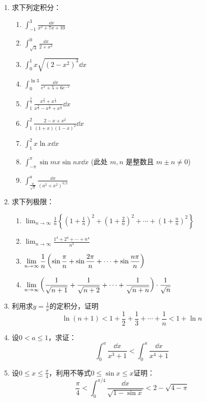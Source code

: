 \begin{enumerate}
\item 求下列定积分：
\begin{multicols}{2}
    \begin{enumerate}
        \item  $\displaystyle\int_{-1}^{3} \frac{\dd x}{x^{2}+7 x+10} $
        \item  $\displaystyle\int_{\sqrt{3}}^{0} \frac{\dd x}{2+x^{2}}$
        \item  $\displaystyle\int_{0}^{1} x \sqrt{\left(2-x^{2}\right)^{3}} \dd x$
        \item  $\displaystyle\int_{0}^{\ln 3} \frac{\dd x}{e^{x}+5+6 e^{-x}}$
        \item  $\displaystyle\int_{1}^{\tfrac{7}{5}} \frac{x^{\tfrac{3}{4}}+x^{\tfrac{1}{4}}}{x^{\tfrac{9}{4}}-x^{\tfrac{5}{4}}+x^{\tfrac{1}{4}}} \dd x$
        \item  $\displaystyle\int_{1}^{2} \frac{2-x+x^{2}}{(1+x)(1-x)^{2}} \dd x$
        \item  $\displaystyle\int_{1}^{2} x \ln x \dd x$
        \item  $\displaystyle\int_{-\pi}^{\pi} \sin m x \sin n x \dd x$
        (此处 $m, n$ 是整数且 $m \pm n\ne 0$)
\item  $\displaystyle\int_{\tfrac{a}{\sqrt{3}}}^{a} \frac{\dd x}{\left(a^{2}+x^{2}\right)^{3 / 2}}$
\end{enumerate}
\end{multicols}
\item  求下列极限：
    \begin{enumerate}
\item  $\displaystyle\lim _{n \to  \infty} \frac{1}{n}\left\{\left(1+
\frac{1}{n}\right)^2+\left(1+\frac{2}{n}\right)^2+\cdots+
\left(1+\frac{n}{n}\right)^{2}\right\}$
\item $\displaystyle\lim _{n \to  \infty} \frac{1^{4}+2^{4}+\cdots+n^{4}}{n^{5}}$
\item $\displaystyle\lim_{n\to\infty}\dfrac{1}{n}\left(\sin\dfrac{\pi}{n}+\sin\dfrac{2\pi}{n}+\cdots+\sin\dfrac{n\pi}{n}\right)$
\item $\displaystyle\lim_{n\to\infty}\left(\dfrac{1}{\sqrt{n+1}}+\dfrac{1}{\sqrt{n+2}}+\cdots+\dfrac{1}{\sqrt{n+n}}\right)\cdot \dfrac{1}{\sqrt{n}}$
\end{enumerate}

\item 利用求$y=\frac{1}{x}$的定积分，证明
\[\ln(n+1)<1+\frac{1}{2}+\frac{1}{3}+\cdots+\frac{1}{n}<1+\ln n\]
\item 设$0<a\le 1$，求证：
\[\int^a_0\frac{\dd x}{x^3+1}<\int^a_0\frac{\dd x}{x^4+1} \]
\item 设$0\le x\le \frac{\pi}{4}$，利用不等式$0\le \sin x\le x$证明：
\[\frac{\pi}{4}<\int^{\pi/4}_0\frac{\dd x}{\sqrt{1-\sin x}}<2-\sqrt{4-\pi}\]


\end{enumerate}
